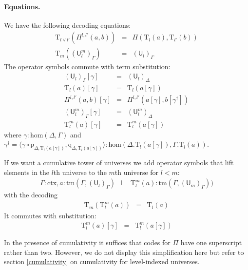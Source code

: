 \documentclass[submission,copyright,creativecommons]{eptcs}
\newcommand{\UU}{\mathsf{U}}
\def\UU{\mathsf{U}}
\newcommand{\N}{\mathsf{N}}
\def\sub{\mathrm{hom}}
\newcommand{\ctx}{\mathrm{ctx}}
\newcommand{\tm}{\mathrm{tm}}
\def\p{\mathrm{p}}
\def\q{\mathrm{q}}
\def\U{\mathsf{U}}
\newcommand{\Ta}{\mathrm{T}}
\begin{document}
\paragraph{Equations.}
We have the following decoding equations:
\begin{eqnarray*}
\Ta_{l \vee l'}(\Pi^{l,l'}(a,b)) &=& \Pi(\Ta_l(a),\Ta_{l'}(b))\\
\Ta_{m}((\UU^m_l)_\Gamma) &=& (\UU_l)_\Gamma
\end{eqnarray*}
The operator symbols commute with term substitution:
\begin{eqnarray*}
(\U_l)_\Gamma [ \gamma ] &=& (\U_l)_\Delta\\
\Ta_l(a) [ \gamma ] &=& \Ta_l(a[ \gamma ] )\\
\Pi^{l,l'}(a,b)[ \gamma ] &=& \Pi^{l,l'}(a [ \gamma ], b[ \gamma^\dagger ])\\
(\UU^m_l)_\Gamma[ \gamma ] &=&(\UU^m_l)_\Delta\\
\Ta^m_{l}(a)[\gamma] &=& \Ta^m_{l}(a[\gamma])
\end{eqnarray*}
where $\gamma : \sub(\Delta,\Gamma)$ and $\gamma^\dagger = \langle \gamma \circ \p_{\Delta,\Ta_l(a[\gamma])}, \q_{\Delta,\Ta_l(a[\gamma])}\rangle : \sub(\Delta.\Ta_l(a[\gamma]),\Gamma.\Ta_l(a))$.

If we want a cumulative tower of universes we add operator symbols that lift elements in the $l$th universe to the $m$th universe for $l < m$:
\begin{eqnarray*}
\Gamma : \ctx, a : \tm(\Gamma,(\U_{l})_\Gamma) &\vdash& {\Ta^m_{l}}(a) : \tm(\Gamma,(\U_{m})_\Gamma))
\end{eqnarray*}
with the decoding
\begin{eqnarray*}
\Ta_m(\Ta^m_{l}(a)) &=& \Ta_l(a)
\end{eqnarray*}
It commutes with substitution:
\begin{eqnarray*}
\Ta^m_{l}(a)[\gamma] &=& \Ta^m_{l}(a[\gamma])
\end{eqnarray*}

In the presence of cumulativity it suffices that codes for $\Pi$ have one superscript rather than two. However, we
 do not display this simplification here but refer to section  \ref{cumulativity} on cumulativity for level-indexed universes.
\end{document}
